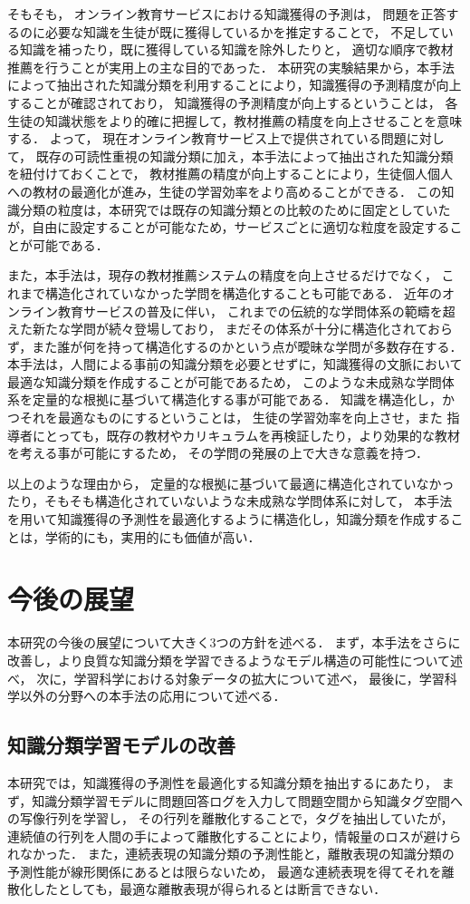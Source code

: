 そもそも，
オンライン教育サービスにおける知識獲得の予測は，
問題を正答するのに必要な知識を生徒が既に獲得しているかを推定することで，
不足している知識を補ったり，既に獲得している知識を除外したりと，
適切な順序で教材推薦を行うことが実用上の主な目的であった．
本研究の実験結果から，本手法によって抽出された知識分類を利用することにより，知識獲得の予測精度が向上することが確認されており，
知識獲得の予測精度が向上するということは，
各生徒の知識状態をより的確に把握して，教材推薦の精度を向上させることを意味する．
よって，
現在オンライン教育サービス上で提供されている問題に対して，
既存の可読性重視の知識分類に加え，本手法によって抽出された知識分類を紐付けておくことで，
教材推薦の精度が向上することにより，生徒個人個人への教材の最適化が進み，生徒の学習効率をより高めることができる．
この知識分類の粒度は，本研究では既存の知識分類との比較のために固定としていたが，自由に設定することが可能なため，サービスごとに適切な粒度を設定することが可能である．


また，本手法は，現存の教材推薦システムの精度を向上させるだけでなく，
これまで構造化されていなかった学問を構造化することも可能である．
近年のオンライン教育サービスの普及に伴い，
これまでの伝統的な学問体系の範疇を超えた新たな学問が続々登場しており，
まだその体系が十分に構造化されておらず，また誰が何を持って構造化するのかという点が曖昧な学問が多数存在する．
本手法は，人間による事前の知識分類を必要とせずに，知識獲得の文脈において最適な知識分類を作成することが可能であるため，
このような未成熟な学問体系を定量的な根拠に基づいて構造化する事が可能である．
知識を構造化し，かつそれを最適なものにするということは，
生徒の学習効率を向上させ，また
指導者にとっても，既存の教材やカリキュラムを再検証したり，より効果的な教材を考える事が可能にするため，
その学問の発展の上で大きな意義を持つ．

以上のような理由から，
定量的な根拠に基づいて最適に構造化されていなかったり，そもそも構造化されていないような未成熟な学問体系に対して，
本手法を用いて知識獲得の予測性を最適化するように構造化し，知識分類を作成することは，学術的にも，実用的にも価値が高い．


\section{今後の展望}
本研究の今後の展望について大きく3つの方針を述べる．
まず，本手法をさらに改善し，より良質な知識分類を学習できるようなモデル構造の可能性について述べ，
次に，学習科学における対象データの拡大について述べ，
最後に，学習科学以外の分野への本手法の応用について述べる．


\subsection{知識分類学習モデルの改善}
本研究では，知識獲得の予測性を最適化する知識分類を抽出するにあたり，
まず，知識分類学習モデルに問題回答ログを入力して問題空間から知識タグ空間への写像行列を学習し，
その行列を離散化することで，タグを抽出していたが，
連続値の行列を人間の手によって離散化することにより，情報量のロスが避けられなかった．
また，連続表現の知識分類の予測性能と，離散表現の知識分類の予測性能が線形関係にあるとは限らないため，
最適な連続表現を得てそれを離散化したとしても，最適な離散表現が得られるとは断言できない．

